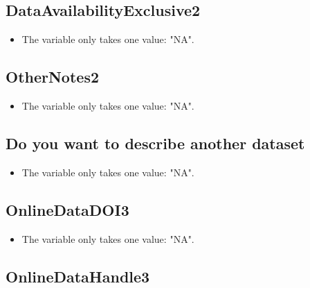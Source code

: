 \documentclass[]{article}
\providecommand{\tightlist}{%
  \setlength{\itemsep}{0pt}\setlength{\parskip}{0pt}}
\newcommand{\fullline}{\noindent\makebox[\linewidth]{\rule{\textwidth}{0.4pt}}}
\begin{document}
\fullline

\hypertarget{dataavailabilityexclusive2}{\subsection{DataAvailabilityExclusive2}\label{dataavailabilityexclusive2}}

\begin{itemize}
\tightlist
\item
  The variable only takes one value: "NA".
\end{itemize}

\fullline

\hypertarget{othernotes2}{\subsection{OtherNotes2}\label{othernotes2}}

\begin{itemize}
\tightlist
\item
  The variable only takes one value: "NA".
\end{itemize}

\fullline

\hypertarget{do-you-want-to-describe-another-dataset}{\subsection{Do you
want to describe another
dataset}\label{do-you-want-to-describe-another-dataset}}

\begin{itemize}
\tightlist
\item
  The variable only takes one value: "NA".
\end{itemize}

\fullline

\hypertarget{onlinedatadoi3}{\subsection{OnlineDataDOI3}\label{onlinedatadoi3}}

\begin{itemize}
\tightlist
\item
  The variable only takes one value: "NA".
\end{itemize}

\fullline

\hypertarget{onlinedatahandle3}{\subsection{OnlineDataHandle3}\label{onlinedatahandle3}}
\end{document}
